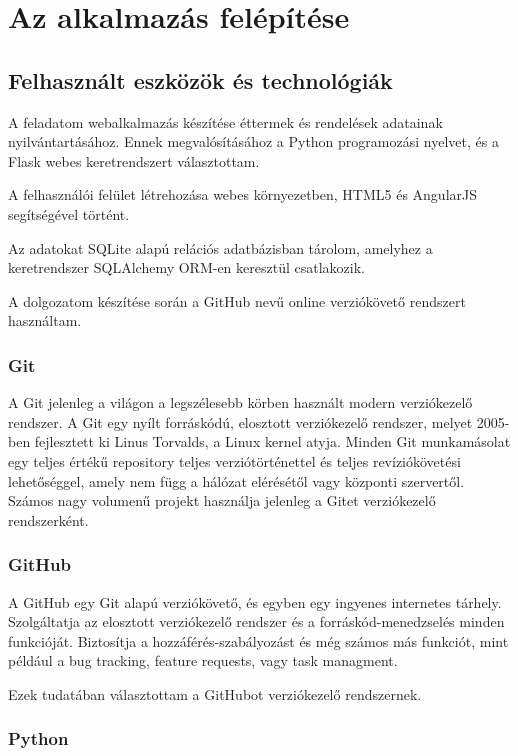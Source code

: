 \chapter{Az alkalmazás felépítése}

\section{Felhasznált eszközök és technológiák}

A feladatom webalkalmazás készítése éttermek és rendelések adatainak nyilvántartásához. Ennek megvalósításához a Python programozási nyelvet, és a Flask webes keretrendszert választottam.

A felhasználói felület létrehozása webes környezetben, HTML5 és AngularJS segítségével történt.

Az adatokat SQLite alapú relációs adatbázisban tárolom, amelyhez a keretrendszer SQLAlchemy ORM-en keresztül csatlakozik. 

A dolgozatom készítése során a GitHub nevű online verziókövető rendszert használtam.

\subsection{Git}

A Git jelenleg a világon a legszélesebb körben használt modern verziókezelő rendszer. A Git egy nyílt forráskódú, elosztott verziókezelő rendszer, melyet 2005-ben fejlesztett ki Linus Torvalds, a Linux kernel atyja. Minden Git munkamásolat egy teljes értékű repository teljes verziótörténettel és teljes revíziókövetési lehetőséggel, amely nem függ a hálózat elérésétől vagy központi szervertől. Számos nagy volumenű projekt használja jelenleg a Gitet verziókezelő rendszerként.

\subsection{GitHub}

A GitHub egy Git alapú verziókövető, és egyben egy ingyenes internetes tárhely. Szolgáltatja az elosztott verziókezelő rendszer és a forráskód-menedzselés minden funkcióját. Biztosítja a hozzáférés-szabályozást és még számos más funkciót, mint például a bug tracking, feature requests, vagy task managment.

Ezek tudatában választottam a GitHubot verziókezelő rendszernek.

\subsection{Python}

